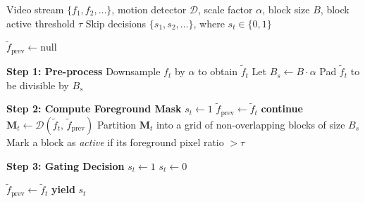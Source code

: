 \documentclass{article}
\begin{document}
\begin{preview}

    \setcounter{algorithm}{0} %

    \begin{algorithm}[H]
        \caption{Skip Module $\mathcal{S}$: Motion-Based Frame Gating}
        \label{alg:skipmodule}
        \begin{algorithmic}[1]

            \Require Video stream $\{f_1, f_2, \dots\}$, motion
            detector $\mathcal{D}$,
            scale factor $\alpha$, block size $B$, block active threshold $\tau$
            \Ensure Skip decisions $\{s_1, s_2, \dots\}$, where $s_t
            \in \{0,1\}$

            \State $\tilde{f}_{\text{prev}} \leftarrow \text{null}$


            \Statex \hspace{1.5em} \textbf{Step 1: Pre-process}
            \State Downsample $f_t$ by $\alpha$ to obtain $\tilde{f}_t$
            \State Let $B_s \leftarrow B \cdot \alpha$
            \State Pad $\tilde{f}_t$ to be divisible by $B_s$

            \Statex \hspace{1.5em} \textbf{Step 2: Compute Foreground Mask}
             
            \State $s_t \leftarrow 1$ 
            \State $\tilde{f}_{\text{prev}} \leftarrow \tilde{f}_t$
            \State \textbf{continue}
            \EndIf
            \State $\mathbf{M}_t \leftarrow
            \mathcal{D}(\tilde{f}_t,\, \tilde{f}_{\text{prev}})$
            \State Partition $\mathbf{M}_t$ into a grid of
            non-overlapping blocks of size $B_s$
            \State Mark a block as \textit{active} if its foreground
            pixel ratio $> \tau$

            \Statex \hspace{1.5em} \textbf{Step 3: Gating Decision}
            \State $s_t \leftarrow 1$ 
            \Else
            \State $s_t \leftarrow 0$ 
            \EndIf

            \State $\tilde{f}_{\text{prev}} \leftarrow \tilde{f}_t$
            \State \textbf{yield} $s_t$

            \EndFor

        \end{algorithmic}
    \end{algorithm}

\end{preview}
\end{document}

